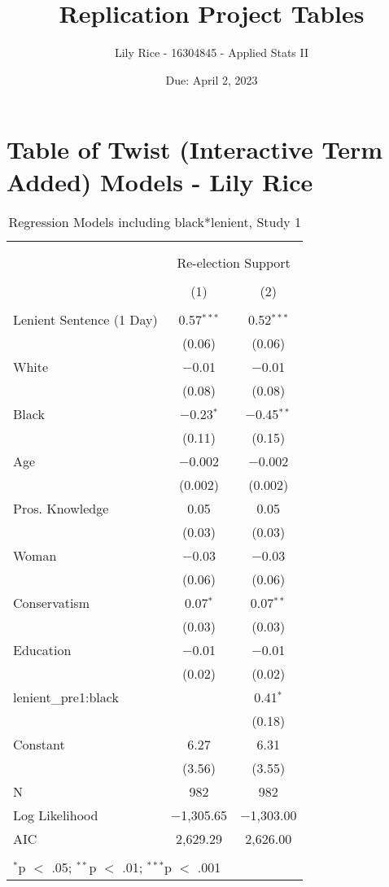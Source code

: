 \documentclass[12pt,letterpaper]{article}
\title{Replication Project Tables}
\date{Due: April 2, 2023}
\author{Lily Rice - 16304845 - Applied Stats II}
\begin{document}
	\maketitle
	\section*{Table of Twist (Interactive Term Added) Models - Lily Rice}

\begin{table}[!htbp] \centering   \caption{Regression Models including black*lenient, Study 1}   \label{} \begin{tabular}{@{\extracolsep{5pt}}lcc} \\[-1.8ex]\hline \\[-1.8ex] \\[-1.8ex] & \multicolumn{2}{c}{Re-election Support} \\ \\[-1.8ex] & (1) & (2)\\ \hline \\[-1.8ex]  Lenient Sentence (1 Day) & 0.57$^{***}$ & 0.52$^{***}$ \\   & (0.06) & (0.06) \\   White & $-$0.01 & $-$0.01 \\   & (0.08) & (0.08) \\   Black & $-$0.23$^{*}$ & $-$0.45$^{**}$ \\   & (0.11) & (0.15) \\   Age & $-$0.002 & $-$0.002 \\   & (0.002) & (0.002) \\   Pros. Knowledge & 0.05 & 0.05 \\   & (0.03) & (0.03) \\   Woman & $-$0.03 & $-$0.03 \\   & (0.06) & (0.06) \\   Conservatism & 0.07$^{*}$ & 0.07$^{**}$ \\   & (0.03) & (0.03) \\   Education & $-$0.01 & $-$0.01 \\   & (0.02) & (0.02) \\   lenient\_pre1:black &  & 0.41$^{*}$ \\   &  & (0.18) \\   Constant & 6.27 & 6.31 \\   & (3.56) & (3.55) \\  N & 982 & 982 \\ Log Likelihood & $-$1,305.65 & $-$1,303.00 \\ AIC & 2,629.29 & 2,626.00 \\ \hline \\[-1.8ex] \multicolumn{3}{l}{$^{*}$p $<$ .05; $^{**}$p $<$ .01; $^{***}$p $<$ .001} \\ \end{tabular} \end{table} 
\end{document}
